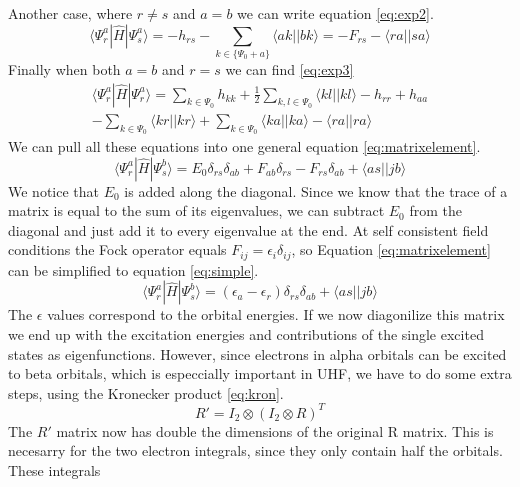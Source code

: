 \documentclass[twoside,twocolumn,9pt]{article}
\begin{document}
Another case, where $r \neq s$ and $a = b$ we can write equation \eqref{eq:exp2}.
\begin{equation}\label{eq:exp2}
  \langle \Psi_r^a|\hat{H}|\Psi^a_s \rangle = -h_{rs} - \sum_{k \in \{\Psi_0 + a\}} \langle ak || bk \rangle = -F_{rs} - \langle ra || sa \rangle
\end{equation}
Finally when both $a = b$ and $r = s$ we can find \eqref{eq:exp3}
\begin{multline}\label{eq:exp3}
  \langle \Psi^a_r|\hat{H}|\Psi^a_r \rangle = \sum_{k \in \Psi_0}h_{kk} + \frac{1}{2}\sum_{k,l \in \Psi_0} \langle kl||kl \rangle - h_{rr} + h_{aa} \\ - \sum_{k \in \Psi_0} \langle
  kr || kr \rangle + \sum_{k \in \Psi_0} \langle ka||ka \rangle - \langle ra||ra \rangle
\end{multline}
We can pull all these equations into one general equation \eqref{eq:matrixelement}.
\begin{equation}\label{eq:matrixelement}
  \langle \Psi_r^a|\hat{H}|\Psi_s^b \rangle = E_0\delta_{rs}\delta_{ab} + F_{ab}\delta_{rs} - F_{rs}\delta_{ab} + \langle as || jb \rangle
\end{equation}
We notice that $E_0$ is added along the diagonal. Since we know that the trace of a matrix is equal to the sum of its eigenvalues, we can subtract $E_0$ from the diagonal and just
add it to every eigenvalue at the end. At self consistent field conditions the Fock operator equals $F_{ij} = \epsilon_i\delta_{ij}$, so Equation \eqref{eq:matrixelement} can be
simplified to equation \eqref{eq:simple}.
\begin{equation}\label{eq:simple}
  \langle \Psi_r^a|\hat{H}|\Psi_s^b \rangle = (\epsilon_a - \epsilon_r)\delta_{rs}\delta_{ab} + \langle as || jb \rangle
\end{equation}
The $\epsilon$ values correspond to the orbital energies. If we now diagonilize this matrix we end up with the excitation energies and contributions of the single excited states as
eigenfunctions. However, since electrons in alpha orbitals can be excited to beta orbitals, which is especcially important in UHF, we have to do some extra steps, using the
Kronecker product \eqref{eq:kron}.
\begin{equation}\label{eq:kron}
  R' = I_2 \otimes (I_2 \otimes R)^T
\end{equation}
The $R'$ matrix now has double the dimensions of the original R matrix. This is necesarry for the two electron integrals, since they only contain half the orbitals. These integrals
\end{document}
